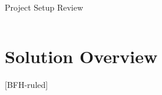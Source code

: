 \documentclass[
    ngerman,%
    authorontitle=true,
]{bfhbeamer}
\begin{document}
\begin{frame}{Project Setup Review}
\begin{columns}
\begin{column}{0.23\textwidth}
\begin{center}
	    		\end{center}
    		\end{column}
    	\end{columns}
    \end{frame}



	\section{Solution Overview}
	[BFH-ruled]
	\frame{\sectionpage}
	
\end{document}
